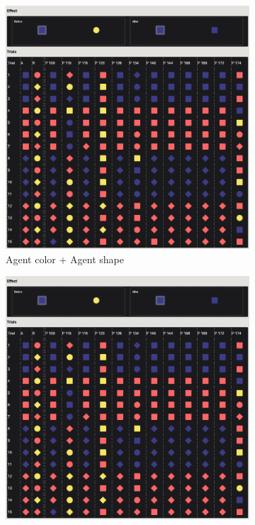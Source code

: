 \documentclass{article}
\begin{document}
\begin{figure}[h!]
  \begin{subfigure}[t]{0.32\textwidth}
    \centering
    \includegraphics[width=\linewidth]{rev_06} 
    \caption{Agent color + Agent shape} \label{fig:learn06}
  \end{subfigure}
  \begin{subfigure}[t]{0.32\textwidth}
    \centering
    \includegraphics[width=\linewidth]{rev_06} 

\end{subfigure}
\end{figure}
\end{document}
